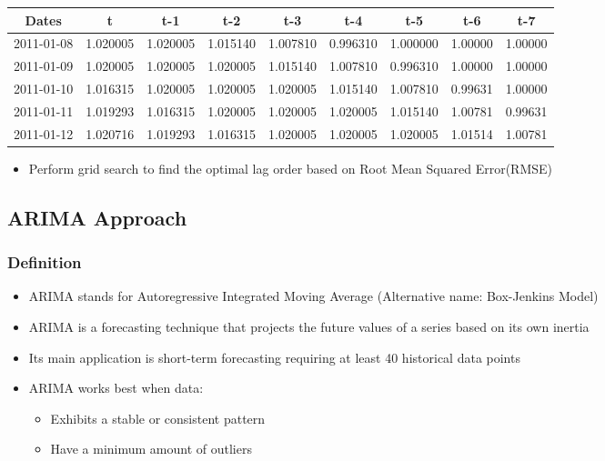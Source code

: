 \documentclass[11pt]{article}
\providecommand{\tightlist}{%
      \setlength{\itemsep}{0pt}\setlength{\parskip}{0pt}}
\begin{document}
\begin{longtable}[]{@{}ccccccccc@{}}
\toprule
\textbf{Dates} & \textbf{t} & \textbf{t-1} & \textbf{t-2} & \textbf{t-3}
& \textbf{t-4} & \textbf{t-5} & \textbf{t-6} &
\textbf{t-7}\tabularnewline
\midrule
\endhead
2011-01-08 & 1.020005 & 1.020005 & 1.015140 & 1.007810 & 0.996310 &
1.000000 & 1.00000 & 1.00000\tabularnewline
2011-01-09 & 1.020005 & 1.020005 & 1.020005 & 1.015140 & 1.007810 &
0.996310 & 1.00000 & 1.00000\tabularnewline
2011-01-10 & 1.016315 & 1.020005 & 1.020005 & 1.020005 & 1.015140 &
1.007810 & 0.99631 & 1.00000\tabularnewline
2011-01-11 & 1.019293 & 1.016315 & 1.020005 & 1.020005 & 1.020005 &
1.015140 & 1.00781 & 0.99631\tabularnewline
2011-01-12 & 1.020716 & 1.019293 & 1.016315 & 1.020005 & 1.020005 &
1.020005 & 1.01514 & 1.00781\tabularnewline
\bottomrule
\end{longtable}

\begin{itemize}
\tightlist
\item
  Perform grid search to find the optimal lag order based on Root Mean
  Squared Error(RMSE)
\end{itemize}

\subsection{ARIMA Approach}\label{arima-approach}

\subsubsection{Definition}\label{definition}

\begin{itemize}
\tightlist
\item
  ARIMA stands for Autoregressive Integrated Moving Average (Alternative
  name: Box-Jenkins Model)
\item
  ARIMA is a forecasting technique that projects the future values of a
  series based on its own inertia
\item
  Its main application is short-term forecasting requiring at least 40
  historical data points
\item
  ARIMA works best when data:

  \begin{itemize}
  \tightlist
  \item
    Exhibits a stable or consistent pattern
  \item
    Have a minimum amount of outliers
  \end{itemize}
\end{itemize}
\end{document}
